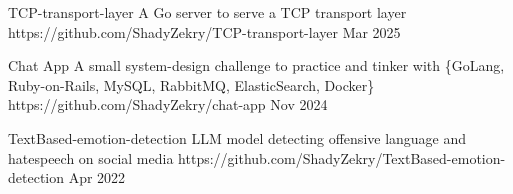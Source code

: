 \begin{cvprojects}

  \cvproject
    {TCP-transport-layer} %
    {A Go server to serve a TCP transport layer} %
    {https://github.com/ShadyZekry/TCP-transport-layer} %
    {Mar 2025} %

  \cvproject
    {Chat App} %
    {A small system-design challenge to practice and tinker with \{GoLang, Ruby-on-Rails, MySQL, RabbitMQ, ElasticSearch, Docker\}} %
    {https://github.com/ShadyZekry/chat-app} %
    {Nov 2024} %

  \cvproject
    {TextBased-emotion-detection} %
    {LLM model detecting offensive language and hatespeech on social media} %
    {https://github.com/ShadyZekry/TextBased-emotion-detection} %
    {Apr 2022} %

\end{cvprojects}

